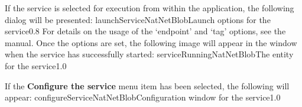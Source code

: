 \insertStandardServiceCommands
\secondaryEnd
{}
If the service is selected for execution from within the \emph{\MMMU} application, the
following dialog will be presented:
%
{launchServiceNatNetBlob}{Launch options for the \emph{\NNBI} service}{0.8}
\condPage{}
For details on the usage of the `endpoint' and `tag' options, see the \emph{\MMMU} manual.
Once the options are set, the following image will appear in the \emph{\MMMU} window when
the service has successfully started:
%
{serviceRunningNatNetBlob}{The \emph{\MMMU} entity for the \emph{\NNBI} service}{1.0}

If the \textbf{Configure the service} menu item has been selected, the following will
appear:
%
{configureServiceNatNetBlob}{Configuration window for the \emph{\NNBI} service}{1.0}
\secondaryEnd
\primaryEnd{}
